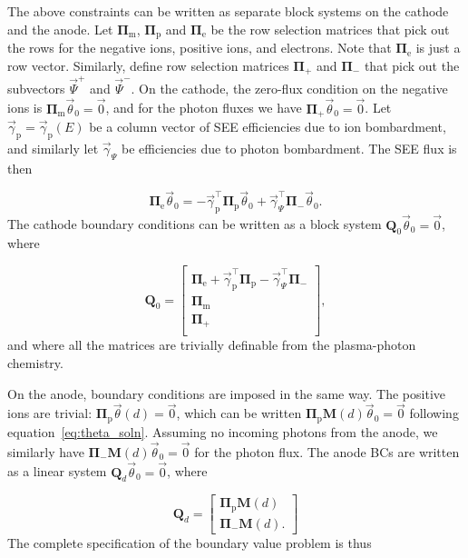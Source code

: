 \documentclass{iopjournal}
\newcommand{\e}{\ensuremath{\text{e}}}
\newcommand{\p}{\ensuremath{\text{p}}}
\newcommand{\m}{\ensuremath{\text{m}}}
\providecommand\Pie{\ensuremath{\bm{\Pi}_\e}}
\providecommand\Pip{\ensuremath{\bm{\Pi}_\p}}
\providecommand\Pim{\ensuremath{\bm{\Pi}_\m}}
\providecommand\Pir{\ensuremath{\bm{\Pi}_+}}
\providecommand\Pil{\ensuremath{\bm{\Pi}_-}}
\begin{document}
The above constraints can be written as separate block systems on the cathode and the anode.
Let $\Pim$, $\Pip$ and $\Pie$ be the row selection matrices that pick out the rows for the negative ions, positive ions, and electrons.
Note that $\Pie$ is just a row vector.
Similarly, define row selection matrices $\Pir$ and $\Pil$ that pick out the subvectors $\vec{\Psi}^+$ and $\vec{\Psi}^-$.
On the cathode, the zero-flux condition on the negative ions is $\Pim\vec{\theta}_0 = \vec{0}$, and for the photon fluxes we have $\Pir\vec{\theta}_0 = \vec{0}$.
Let $\vec{\gamma}_\p = \vec{\gamma}_\p(E)$ be a column vector of SEE efficiencies due to ion bombardment, and similarly let $\vec{\gamma}_\Psi$ be efficiencies due to photon bombardment.
The SEE flux is then

\begin{equation}
  \label{eq:see_condition}
  \Pie\vec{\theta}_0 = -\vec{\gamma}_\p^\intercal\Pip\vec{\theta}_0 + \vec{\gamma}_\Psi^\intercal\Pil\vec{\theta}_0.
\end{equation}
The cathode boundary conditions can be written as a block system $\bm{Q}_0\vec{\theta}_0 = \vec{0}$, where

\begin{equation}
  \bm{Q}_0 = \begin{bmatrix}
    \Pie + \vec{\gamma}_\p^\intercal\Pip - \vec{\gamma}_\Psi^\intercal\Pil\\
    \Pim \\
    \Pir \\
  \end{bmatrix},
\end{equation}
and where all the matrices are trivially definable from the plasma-photon chemistry.

On the anode, boundary conditions are imposed in the same way.
The positive ions are trivial: $\Pip\vec{\theta}(d) = \vec{0}$, which can be written $\Pip\bm{M}(d)\vec{\theta}_0 = \vec{0}$ following equation~\eqref{eq:theta_soln}.
Assuming no incoming photons from the anode, we similarly have $\Pil\bm{M}(d)\vec{\theta}_0 = \vec{0}$ for the photon flux.
The anode BCs are written as a linear system $\bm{Q}_d\vec{\theta}_0 = \vec{0}$, where

\begin{equation}
  \bm{Q}_d = \begin{bmatrix}
    \Pip\bm{M}(d) \\
    \Pil\bm{M}(d).
  \end{bmatrix}
\end{equation}
The complete specification of the boundary value problem is thus
\end{document}
